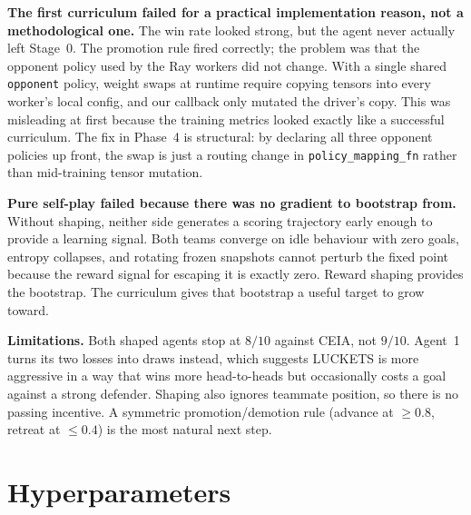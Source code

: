 \documentclass{article}
\begin{document}
\textbf{The first curriculum failed for a practical implementation reason, not a methodological one.}
The win rate looked strong, but the agent never actually left Stage~$0$.
The promotion rule fired correctly; the problem was that the opponent policy used by the Ray workers did not change.
With a single shared \texttt{opponent} policy, weight swaps at runtime require copying tensors into every worker's local config, and our callback only mutated the driver's copy.
This was misleading at first because the training metrics looked exactly like a successful curriculum.
The fix in Phase~4 is structural: by declaring all three opponent policies up front, the swap is just a routing change in \texttt{policy\_mapping\_fn} rather than mid-training tensor mutation.

\textbf{Pure self-play failed because there was no gradient to bootstrap from.}
Without shaping, neither side generates a scoring trajectory early enough to provide a learning signal.
Both teams converge on idle behaviour with zero goals, entropy collapses, and rotating frozen snapshots cannot perturb the fixed point because the reward signal for escaping it is exactly zero.
Reward shaping provides the bootstrap.
The curriculum gives that bootstrap a useful target to grow toward.

\textbf{Limitations.}
Both shaped agents stop at $8/10$ against CEIA, not $9/10$.
Agent~1 turns its two losses into draws instead, which suggests LUCKETS is more aggressive in a way that wins more head-to-heads but occasionally costs a goal against a strong defender.
Shaping also ignores teammate position, so there is no passing incentive.
A symmetric promotion/demotion rule (advance at $\ge 0.8$, retreat at $\le 0.4$) is the most natural next step.




\appendix
\section{Hyperparameters}
\label{sec:hp}
\end{document}
